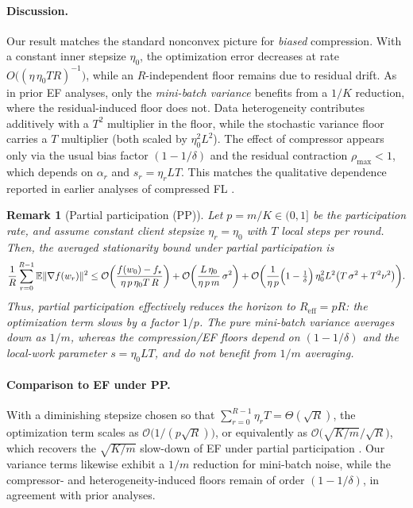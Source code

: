 \documentclass{article} %
\newcommand{\E}{\mathbb{E}}
\newtheorem{remark}{Remark}
\begin{document}
\paragraph{Discussion.}
Our result matches the standard nonconvex picture for \emph{biased} compression. With a constant inner stepsize $\eta_0$, the optimization error decreases at rate $O\big((\eta\,\eta_0 T R)^{-1}\big)$, while an $R$-independent floor remains due to residual drift. As in prior EF analyses, only the \emph{mini-batch variance} benefits from a $1/K$ reduction, where the residual-induced floor does not. Data heterogeneity contributes additively with a $T^2$ multiplier in the floor, while the stochastic variance floor carries a $T$ multiplier (both scaled by $\eta_0^2L^2$). The effect of compressor appears only via the usual bias factor $(1-1/\delta)$ and the residual contraction $\rho_{\max}<1$, which depends on $\alpha_r$ and $s_r=\eta_rLT$. This matches the qualitative dependence reported in earlier analyses of compressed FL \citep{li2023analysis, karimireddy2020scaffold}.

\begin{remark}[Partial participation (PP)] \label{rem:pp}
Let $p=m/K\in(0,1]$ be the participation rate, and assume constant client stepsize $\eta_r=\eta_0$ with $T$ local steps per round. Then, the averaged stationarity bound under partial participation is
\begin{align}
\frac{1}{R}\sum_{r=0}^{R-1}\E\|\nabla f(w_r)\|^{2}
\le
\mathcal{O}\bigg(\frac{f(w_0)-f_\star}{\eta\,p\,\eta_0 T\,R}\bigg)
+\mathcal{O}\bigg(\frac{L\,\eta_0}{\eta\,p\,m}\,\sigma^{2}\bigg) \notag
+\mathcal{O}\bigg(\frac{1}{\eta\,p}\Bigl(1-\tfrac{1}{\delta}\Bigr)\,
\eta_0^{2}L^{2}\bigl(T\,\sigma^{2}+T^{2}\nu^{2}\bigr)\bigg).
\end{align}
Thus, partial participation effectively reduces the horizon to $R_{\mathrm{eff}}=pR$: the optimization term slows by a factor $1/p$. The pure mini-batch variance averages down as $1/m$, whereas the compression/EF floors depend on $(1-1/\delta)$ and the local-work parameter $s=\eta_0LT$, and do not benefit from $1/m$ averaging.
\end{remark}

\paragraph{Comparison to EF under PP.}
With a diminishing stepsize chosen so that $\sum_{r=0}^{R-1}\eta_r T=\Theta(\sqrt{R})$, the optimization term scales as $\mathcal{O}\!\big(1/(p\sqrt{R})\big)$, or equivalently as $\mathcal{O}\!\big(\sqrt{K/m}/\sqrt{R}\big)$, which recovers the $\sqrt{K/m}$ slow-down of EF under partial participation \citep[Theorem~4.10]{li2023analysis}. Our variance terms likewise exhibit a $1/m$ reduction for mini-batch noise, while the compressor- and heterogeneity-induced floors remain of order $(1-1/\delta)$, in agreement with prior analyses.
\end{document}
